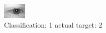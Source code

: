 \begin{figure}[h!]
\begin{center}
\includegraphics[width=0.60\columnwidth]{figures/ID483_class_1_target_2.png}
\end{center}
\caption{ Classification: 1 actual target: 2}
\label{fig:ID483_class_1_target_2}
\end{figure}
